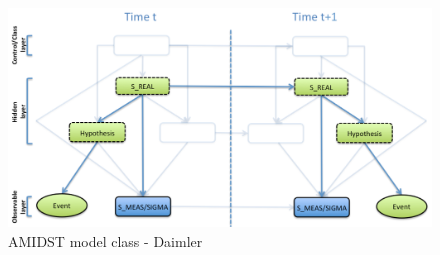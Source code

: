 \begin{figure}[ht!]
\begin{center}
\includegraphics[scale=0.39]{./figures/AMIDSTModelClassDaimler}
\caption{\label{Figure:AMIDSTModelClassDaimler} AMIDST model class - Daimler}
\end{center}
\end{figure}

